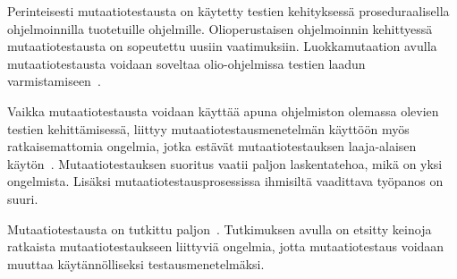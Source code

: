 \documentclass[finnish, grading]{tktltiki2}
\theoremstyle{definition}
\theoremstyle{remark}
\begin{document}
Perinteisesti mutaatiotestausta on käytetty testien kehityksessä proseduraalisella ohjelmoinnilla tuotetuille ohjelmille. Olioperustaisen ohjelmoinnin kehittyessä mutaatiotestausta on sopeutettu uusiin vaatimuksiin. Luokkamutaation avulla mutaatiotestausta voidaan soveltaa olio-ohjelmissa testien laadun varmistamiseen~\cite{Kim:Clark:McDermid:2000}.

Vaikka mutaatiotestausta voidaan käyttää apuna ohjelmiston olemassa olevien testien kehittämisessä, liittyy mutaatiotestausmenetelmän käyttöön myös ratkaisemattomia ongelmia, jotka estävät mutaatiotestauksen laaja-alaisen käytön~\cite[s. 652]{Jia:Harman:2011}. Mutaatiotestauksen suoritus vaatii paljon laskentatehoa, mikä on yksi ongelmista. Lisäksi mutaatiotestausprosessissa ihmisiltä vaadittava työpanos on suuri. 

Mutaatiotestausta on tutkittu paljon~\cite[s. 649]{Jia:Harman:2011}. Tutkimuksen avulla on etsitty keinoja ratkaista mutaatiotestaukseen liittyviä ongelmia, jotta mutaatiotestaus voidaan muuttaa käytännölliseksi testausmenetelmäksi. 

%
%
%
\end{document}
